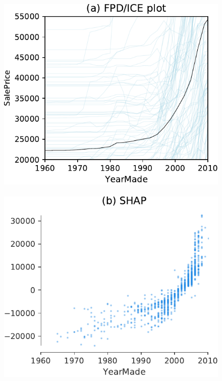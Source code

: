 \documentclass[]{article} %
\newcommand{\cut}[1]{}
\begin{document}
\cut{
pregnant female at max range [233.33467678]
pregnant female in male height range [228.71359869]
nonpregnant female in male height range [209.88006493]
male in male height range [219.46772083]
}


\cut{
$1/n*\sum_{i=1}^n f(x_j = pregnant, x_{i, \bar{j}}) - f(x_j = not pregnant, x_{i, \bar{j}})$

\noindent where ${x_{i, \bar{j}}: i=1,2,?,n}$ are the n training observations of $x_{\bar{j}}$
}

\begin{figure}[!htbp]
\begin{center}
\includegraphics[scale=0.35]{images/bulldozer_YearMade_pdp.pdf}~~
\includegraphics[scale=0.35]{images/bulldozer_YearMade_shap.pdf}~~

\end{center}
\end{figure}
\end{document}
